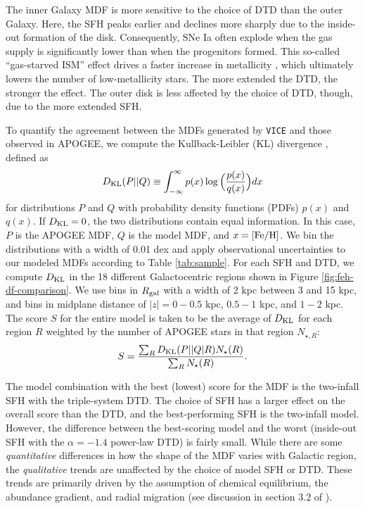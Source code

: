 \documentclass[twocolumn,twocolappendix,linenumbers]{aastex631}
\newcommand{\vice}{{\tt VICE}\xspace}
\begin{document}
The inner Galaxy MDF is more sensitive to the choice of DTD than the outer Galaxy. Here, the SFH peaks earlier and declines more sharply due to the inside-out formation of the disk. Consequently, SNe Ia often explode when the gas supply is significantly lower than when the progenitors formed. This so-called ``gas-starved ISM'' effect drives a faster increase in metallicity \citep[see analytic demonstration in][]{Weinberg2017-ChemicalEquilibrium}, which ultimately lowers the number of low-metallicity stars. The more extended the DTD, the stronger the effect. The outer disk is less affected by the choice of DTD, though, due to the more extended SFH.

To quantify the agreement between the MDFs generated by \vice and those observed in APOGEE, we compute the Kullback-Leibler (KL) divergence \citep{KullbackLeibler1951}, defined as
\begin{equation}
    D_{\rm{KL}}(P||Q) \equiv \int_{-\infty}^{\infty} p(x) \log\Big(\frac{p(x)}{q(x)}\Big) dx
    \label{eq:kl-divergence}
\end{equation}
for distributions $P$ and $Q$ with probability density functions (PDFs) $p(x)$ and $q(x)$. If $D_{\rm KL}=0$, the two distributions contain equal information. In this case, $P$ is the APOGEE MDF, $Q$ is the model MDF, and $x={\rm [Fe/H]}$. We bin the distributions with a width of 0.01 dex and apply observational uncertainties to our modeled MDFs according to Table \ref{tab:sample}. For each SFH and DTD, we compute $D_{\rm{KL}}$ in the 18 different Galactocentric regions shown in Figure \ref{fig:feh-df-comparison}. We use bins in $R_{\rm gal}$ with a width of 2 kpc between 3 and 15 kpc, and bins in midplane distance of $|z|=0-0.5$ kpc, $0.5-1$ kpc, and $1-2$ kpc. The score $S$ for the entire model is taken to be the average of $D_{\rm{KL}}$ for each region $R$ weighted by the number of APOGEE stars in that region $N_{\star,R}$:
\begin{equation}
    S = \frac{\sum_R D_{\rm KL}(P||Q|R) N_\star(R)}{\sum_R N_\star(R)}.
    \label{eq:feh-df-score}
\end{equation}

The model combination with the best (lowest) score for the MDF is the two-infall SFH with the triple-system DTD. The choice of SFH has a larger effect on the overall score than the DTD, and the best-performing SFH is the two-infall model. However, the difference between the best-scoring model and the worst (inside-out SFH with the $\alpha=-1.4$ power-law DTD) is fairly small. While there are some {\it quantitative} differences in how the shape of the MDF varies with Galactic region, the {\it qualitative} trends are unaffected by the choice of model SFH or DTD. These trends are primarily driven by the assumption of chemical equilibrium, the abundance gradient, and radial migration (see discussion in section 3.2 of ).
\end{document}
